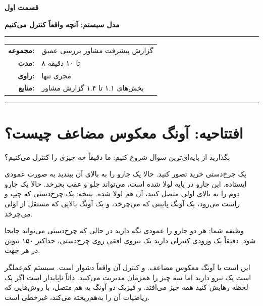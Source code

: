 \documentclass[12pt, a4paper]{article}
\newcommand{\dash}{\lr{---}}
\begin{document}

\thispagestyle{empty}

\vspace*{1.2cm}

{\centering
{\color{seriesblue}\fontsize{24}{30}\selectfont\bfseries قسمت اول}

\vspace{0.5cm}
{\fontsize{15}{20}\selectfont\bfseries مدل سيستم: آنچه واقعاً کنترل می‌کنيم}

\vspace{0.9cm}
{\color{seriesblue}\rule{0.55\linewidth}{1pt}}
\vspace{0.7cm}

{\normalsize
\begin{tabular}{rl}
  \textbf{مجموعه:}     & گزارش پيشرفت مشاور \dash{} بررسی عمیق \\[5pt]
  \textbf{مدت:}        & ۸ تا ۱۰ دقیقه \\[5pt]
  \textbf{راوی:}       & مجری تنها \\[5pt]
  \textbf{منابع:}      & بخش‌های ۱.۱ تا ۱.۴ گزارش مشاور \\
\end{tabular}
}

\vspace{0.9cm}
{\color{seriesblue}\rule{0.55\linewidth}{0.4pt}}
\par}

\vspace{1.2cm}

\section{افتتاحیه: آونگ معکوس مضاعف چيست؟}

بگذاريد از پایه‌ای‌ترين سوال شروع کنيم: ما دقيقاً چه چيزی را کنترل می‌کنيم؟

يک چرخ‌دستی خريد تصور کنيد. حالا يک جارو را به بالای آن ببنديد \dash{} به صورت عمودی ايستاده. اين جارو در پايه لولا شده است، می‌تواند جلو و عقب بچرخد. حالا يک جارو دوم را به بالای اولی متصل کنيد، آن هم لولا شده. نتيجه: يک چرخ‌دستی که چپ و راست می‌رود، يک آونگ پايينی که می‌چرخد، و يک آونگ بالايی که مستقل از اولی می‌چرخد.

وظيفه شما: هر دو جارو را عمودی نگه داريد در حالی که چرخ‌دستی می‌تواند جابجا شود. دقيقاً يک ورودی کنترلی داريد \dash{} يک نيروی افقی روی چرخ‌دستی، حداکثر ۱۵۰ نيوتن در هر جهت.

اين است  يا آونگ معکوس مضاعف. و کنترل آن واقعاً دشوار است. سيستم کم‌عملگر است \dash{} يک نيرو داريد اما سه چيز را همزمان مديريت می‌کنيد. ذاتاً ناپايدار است \dash{} اگر يک لحظه رهايش کنيد همه چيز می‌افتد. و فيزيک دو آونگ به هم متصل، با روش‌هايی که رياضيات آن را به‌هم‌ريخته می‌کند، غيرخطی است.
\end{document}
